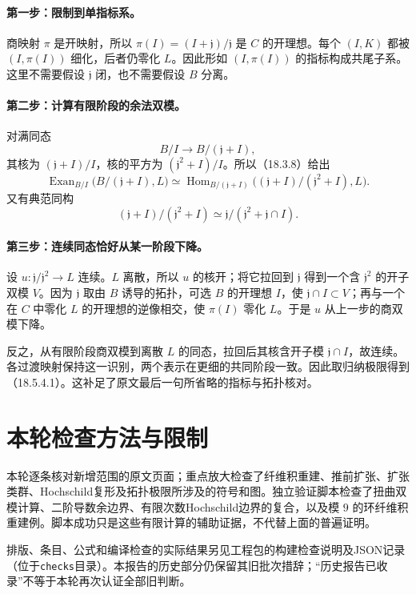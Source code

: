 \documentclass[UTF8,a4paper]{ctexbook}
\DeclareMathOperator{\Hom}{Hom}
\DeclareMathOperator{\Exan}{Exan}
\begin{document}
\paragraph{第一步：限制到单指标系。}
商映射 $\pi$ 是开映射，所以 $\pi(I)=(I+\mathfrak j)/\mathfrak j$ 是 $C$ 的开理想。每个 $(I,K)$ 都被 $(I,\pi(I))$ 细化，后者仍零化 $L$。因此形如 $(I,\pi(I))$ 的指标构成共尾子系。这里不需要假设 $\mathfrak j$ 闭，也不需要假设 $B$ 分离。

\paragraph{第二步：计算有限阶段的余法双模。}
对满同态
\[
 B/I\longrightarrow B/(\mathfrak j+I),
\]
其核为 $(\mathfrak j+I)/I$，核的平方为 $(\mathfrak j^2+I)/I$。所以（18.3.8）给出
\[
 \Exan_{B/I}\bigl(B/(\mathfrak j+I),L\bigr)
 \simeq
 \Hom_{B/(\mathfrak j+I)}
 \bigl((\mathfrak j+I)/(\mathfrak j^2+I),L\bigr).
\]
又有典范同构
\[
 (\mathfrak j+I)/(\mathfrak j^2+I)
 \simeq \mathfrak j/(\mathfrak j^2+\mathfrak j\cap I).
\]

\paragraph{第三步：连续同态恰好从某一阶段下降。}
设 $u:\mathfrak j/\mathfrak j^2\to L$ 连续。$L$ 离散，所以 $u$ 的核开；将它拉回到 $\mathfrak j$ 得到一个含 $\mathfrak j^2$ 的开子双模 $V$。因为 $\mathfrak j$ 取由 $B$ 诱导的拓扑，可选 $B$ 的开理想 $I$，使 $\mathfrak j\cap I\subset V$；再与一个在 $C$ 中零化 $L$ 的开理想的逆像相交，使 $\pi(I)$ 零化 $L$。于是 $u$ 从上一步的商双模下降。

反之，从有限阶段商双模到离散 $L$ 的同态，拉回后其核含开子模 $\mathfrak j\cap I$，故连续。各过渡映射保持这一识别，两个表示在更细的共同阶段一致。因此取归纳极限得到（18.5.4.1）。这补足了原文最后一句所省略的指标与拓扑核对。

\section*{本轮检查方法与限制}
本轮逐条核对新增范围的原文页面；重点放大检查了纤维积重建、推前扩张、扩张类群、Hochschild复形及拓扑极限所涉及的符号和图。独立验证脚本检查了扭曲双模计算、二阶导数余边界、有限次数Hochschild边界的复合，以及模 $9$ 的环纤维积重建例。脚本成功只是这些有限计算的辅助证据，不代替上面的普遍证明。

排版、条目、公式和编译检查的实际结果另见工程包的构建检查说明及JSON记录（位于\texttt{checks}目录）。本报告的历史部分仍保留其旧批次措辞；“历史报告已收录”不等于本轮再次认证全部旧判断。
\setcounter{secnumdepth}{-2}
\end{document}
